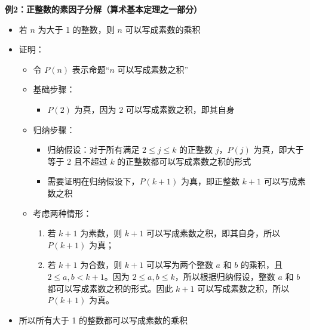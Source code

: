 \documentclass[UTF8]{report}
\theoremstyle{MyLineTheoremStyle} %
\theoremstyle{MyBlockTheoremStyle} %
\theoremstyle{MySubsubsectionStyle} %
\begin{document}
        \textbf{例2：正整数的素因子分解（算术基本定理之一部分）}
        \begin{itemize}
            \item 若 $n$ 为大于 1 的整数，则 $n$ 可以写成素数的乘积
            \item 证明：
            \begin{itemize}
                \item 令 $P(n)$ 表示命题“$n$ 可以写成素数之积”
                \item 基础步骤：
                \begin{itemize}
                    \item $P(2)$ 为真，因为 2 可以写成素数之积，即其自身
                \end{itemize}
                \item 归纳步骤：
                \begin{itemize}
                    \item 归纳假设：对于所有满足 $2 \leq j \leq k$ 的正整数 $j$，$P(j)$ 为真，即大于等于 2 且不超过 $k$ 的正整数都可以写成素数之积的形式
                    \item 需要证明在归纳假设下，$P(k+1)$ 为真，即正整数 $k+1$ 可以写成素数之积
                \end{itemize}
                \item 考虑两种情形：
                \begin{enumerate}
                    \item 若 $k+1$ 为素数，则 $k+1$ 可以写成素数之积，即其自身，所以 $P(k+1)$ 为真；
                    \item 若 $k+1$ 为合数，则 $k+1$ 可以写为两个整数 $a$ 和 $b$ 的乘积，且 $2 \leq a, b < k+1$。因为 $2 \leq a, b \leq k$，所以根据归纳假设，整数 $a$ 和 $b$ 都可以写成素数之积的形式。因此 $k+1$ 可以写成素数之积，所以 $P(k+1)$ 为真。
                \end{enumerate}
            \end{itemize}
            \item 所以所有大于 1 的整数都可以写成素数的乘积
        \end{itemize}
        
\end{document}
